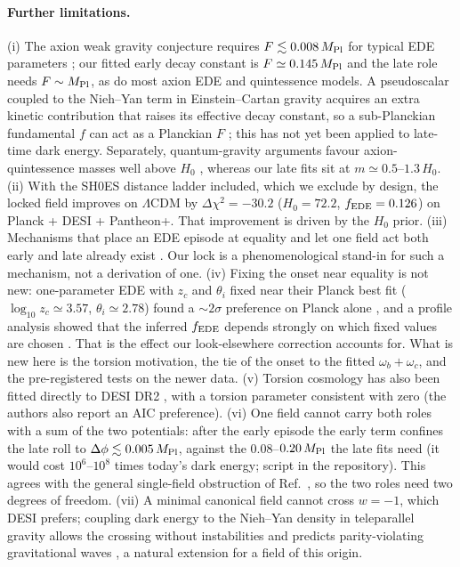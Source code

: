 \documentclass[11pt]{article}
\newcommand{\Mp}{M_{\rm Pl}}
\begin{document}
\paragraph{Further limitations.} (i) The axion weak gravity conjecture requires $F\lesssim0.008\,\Mp$ for typical
EDE parameters \cite{rudelius2022}; our fitted early decay constant is $F\simeq0.145\,\Mp$ and the late role needs
$F\sim\Mp$, as do most axion EDE and quintessence models. A pseudoscalar coupled to the Nieh--Yan term in
Einstein--Cartan gravity acquires an extra kinetic contribution that raises its effective decay constant, so a
sub-Planckian fundamental $f$ can act as a Planckian $F$ \cite{adshead2026}; this has not yet been applied to late-time
dark energy. Separately, quantum-gravity arguments favour axion-quintessence masses well above $H_0$ \cite{shiu2026},
whereas our late fits sit at $m\simeq0.5$--$1.3\,H_0$. (ii) With the SH0ES distance ladder included, which we
exclude by design, the locked field improves on $\Lambda$CDM by $\Delta\chi^2=-30.2$ ($H_0=72.2$, $f_{\rm EDE}=0.126$)
on Planck + DESI + Pantheon+. That improvement is driven by the $H_0$ prior. (iii) Mechanisms that place an EDE
episode at equality and let one field act both early and late already exist \cite{ramadan2023,brissenden2023}. Our
lock is a phenomenological stand-in for such a mechanism, not a derivation of one. (iv) Fixing the onset near equality
is not new: one-parameter EDE with $z_c$ and $\theta_i$ fixed near their Planck best fit ($\log_{10}z_c\simeq3.57$,
$\theta_i\simeq2.78$) found a $\sim2\sigma$ preference on Planck alone \cite{murgia2021,smith2021}, and a profile
analysis showed that the inferred $f_{\rm EDE}$ depends strongly on which fixed values are chosen \cite{herold2022}.
That is the effect our look-elsewhere correction accounts for. What is new here is the torsion motivation, the tie of the
onset to the fitted $\omega_b+\omega_c$, and the pre-registered tests on the newer data. (v) Torsion cosmology has also
been fitted directly to DESI DR2 \cite{liu2025torsion}, with a torsion parameter consistent with zero (the authors
also report an AIC preference). (vi) One field cannot carry both roles with a sum of the two potentials: after the
early episode the early term confines the late roll to $\Delta\phi\lesssim0.005\,\Mp$, against the
$0.08$--$0.20\,\Mp$ the late fits need (it would cost $10^6$--$10^8$ times today's dark energy; script in the
repository). This agrees with the general single-field obstruction of Ref.~\cite{giare2026}, so the two roles need two
degrees of freedom. (vii) A minimal canonical field cannot cross $w=-1$, which DESI prefers; coupling dark energy to
the Nieh--Yan density in teleparallel gravity allows the crossing without instabilities and predicts parity-violating
gravitational waves \cite{kang2026}, a natural extension for a field of this origin.
\end{document}
